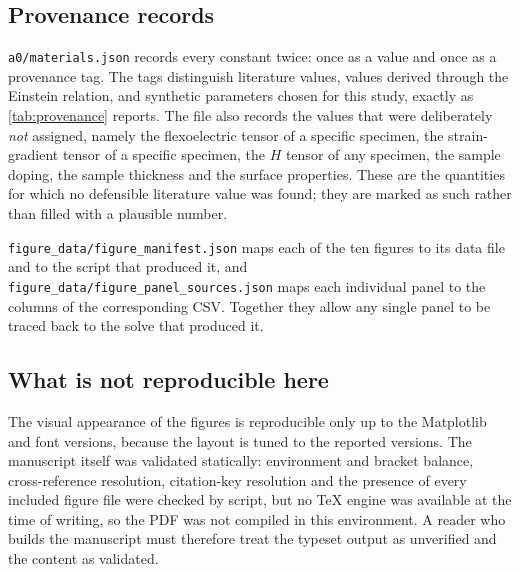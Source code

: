 \subsection{Provenance records}
\label{app:repro_provenance}

\texttt{a0/materials.json} records every constant twice: once as a value and
once as a provenance tag.  The tags distinguish literature values, values
derived through the Einstein relation, and synthetic parameters chosen for this
study, exactly as \cref{tab:provenance} reports.  The file also records the
values that were deliberately \emph{not} assigned, namely the flexoelectric
tensor of a specific specimen, the strain-gradient tensor of a specific
specimen, the $H$ tensor of any specimen, the sample doping, the sample
thickness and the surface properties.  These are the quantities for which no
defensible literature value was found; they are marked as such rather than
filled with a plausible number.

\texttt{figure\_data/figure\_manifest.json} maps each of the ten figures to its
data file and to the script that produced it, and
\texttt{figure\_data/figure\_panel\_sources.json} maps each individual panel to
the columns of the corresponding CSV.  Together they allow any single panel to
be traced back to the solve that produced it.

\subsection{What is not reproducible here}
\label{app:repro_limits}

The visual appearance of the figures is reproducible only up to the Matplotlib
and font versions, because the layout is tuned to the reported versions.  The
manuscript itself was validated statically: environment and bracket balance,
cross-reference resolution, citation-key resolution and the presence of every
included figure file were checked by script, but no TeX engine was available at
the time of writing, so the PDF was not compiled in this environment.  A reader
who builds the manuscript must therefore treat the typeset output as
unverified and the content as validated.
